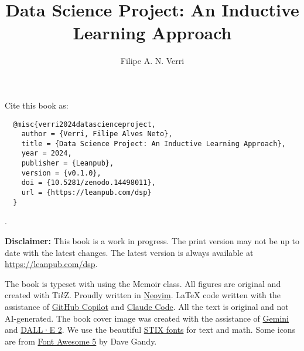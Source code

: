 \documentclass[print]{dspbook}
\title{Data Science Project: An Inductive Learning Approach}
\author{Filipe A. N. Verri}
\begin{document}
\setupfonts
\setuphyperref

\makebooktitle

\cleardoublepage

\frontmatter

\thispagestyle{empty}

\newpage

{
  \footnotesize\noindent Cite this book as:
  \begin{verbatim}
  @misc{verri2024datascienceproject,
    author = {Verri, Filipe Alves Neto},
    title = {Data Science Project: An Inductive Learning Approach},
    year = 2024,
    publisher = {Leanpub},
    version = {v0.1.0},
    doi = {10.5281/zenodo.14498011},
    url = {https://leanpub.com/dsp}
  }
  \end{verbatim}

  \noindent{}.
}

\vfill

{
  \footnotesize\noindent
  \textbf{Disclaimer:} This book is a work in progress.  The print version may not be up
  to date with the latest changes.  The latest version is always available at
  \url{https://leanpub.com/dsp}.
}

\vspace{0.5cm}
{
\footnotesize\noindent
The book is typeset with \XeTeX{} using the Memoir class.  All figures are
original and created with Ti\textit{k}Z.  Proudly written in
\href{https://neovim.io/}{Neovim}.  \LaTeX{} code written with the assistance of
\href{https://github.com/features/copilot}{GitHub Copilot} and
\href{https://www.anthropic.com/claude-code}{Claude Code}.
All the text is original and not AI-generated.
The book cover image was created with the assistance of
\href{https://gemini.google.com}{Gemini} and \href{https://openai.com/dall-e-2}{DALL·E 2}.
We use the beautiful \href{https://www.stixfonts.org/}{STIX fonts} for text and math.
Some icons are from \href{https://fontawesome.com/}{Font Awesome 5} by Dave Gandy.
}
\end{document}
